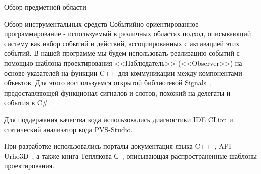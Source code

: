 \begin{section}{Обзор предметной области}
\begin{subsection}{Обзор инструментальных средств}
			Событийно-ориентированное программирование - используемый в различных областях подход, описывающий систему как набор событий и действий, ассоциированных с активацией этих событий.
			В нашей программе мы будем использовать реализацию событий с помощью шаблона проектирования <<Наблюдатель>> (<<Observer>>) на основе указателей на функции C++ для коммуникации между компонентами объектов.
			Для этого воспользуемся открытой библиотекой Signals~\cite{signals}, предоставляющей функционал сигналов и слотов, похожий на делегаты и события в C\#.

			Для поддержания качества кода использовались диагностики IDE CLion и статический анализатор кода PVS-Studio.

			При разработке использовались порталы документация языка C++~\cite{cppreference}, API Urho3D~\cite{urho3d-docs}, а также книга Теплякова С~\cite{teplyakov}, описывающая распространенные шаблоны проектирования.
		\end{subsection}


	\end{section}

